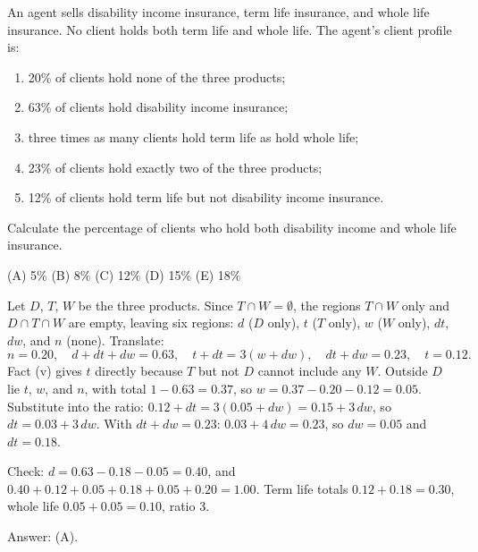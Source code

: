 \begin{example}
An agent sells disability income insurance, term life insurance, and whole life
insurance. No client holds both term life and whole life. The agent's client
profile is:
\begin{enumerate}[nosep,label=(\roman*)]
  \item 20\% of clients hold none of the three products;
  \item 63\% of clients hold disability income insurance;
  \item three times as many clients hold term life as hold whole life;
  \item 23\% of clients hold exactly two of the three products;
  \item 12\% of clients hold term life but not disability income insurance.
\end{enumerate}
Calculate the percentage of clients who hold both disability income and whole life
insurance.

(A) 5\% \qquad (B) 8\% \qquad (C) 12\% \qquad (D) 15\% \qquad (E) 18\%
\end{example}
\begin{solution}
Let $D$, $T$, $W$ be the three products. Since $T \cap W = \emptyset$, the regions
$T \cap W$ only and $D \cap T \cap W$ are empty, leaving six regions: $d$ ($D$ only),
$t$ ($T$ only), $w$ ($W$ only), $dt$, $dw$, and $n$ (none). Translate:
\[
  n = 0.20, \quad d + dt + dw = 0.63, \quad t + dt = 3(w + dw), \quad dt + dw = 0.23,
  \quad t = 0.12 .
\]
Fact (v) gives $t$ directly because $T$ but not $D$ cannot include any $W$.
Outside $D$ lie $t$, $w$, and $n$, with total $1 - 0.63 = 0.37$, so
$w = 0.37 - 0.20 - 0.12 = 0.05$. Substitute into the ratio:
$0.12 + dt = 3(0.05 + dw) = 0.15 + 3\,dw$, so $dt = 0.03 + 3\,dw$. With
$dt + dw = 0.23$: $0.03 + 4\,dw = 0.23$, so $dw = 0.05$ and $dt = 0.18$.

Check: $d = 0.63 - 0.18 - 0.05 = 0.40$, and
$0.40 + 0.12 + 0.05 + 0.18 + 0.05 + 0.20 = 1.00$. Term life totals
$0.12 + 0.18 = 0.30$, whole life $0.05 + 0.05 = 0.10$, ratio $3$.

Answer: (A).
\end{solution}

